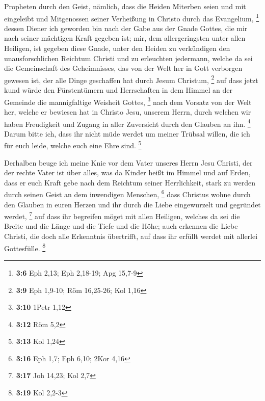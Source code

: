 Propheten durch den Geist,  nämlich, dass die Heiden
Miterben seien und mit eingeleibt und Mitgenossen seiner Verheißung in
Christo durch das Evangelium, \footnote{\textbf{3:6} Eph 2,13; Eph
  2,18-19; Apg 15,7-9}  dessen Diener ich geworden bin nach
der Gabe aus der Gnade Gottes, die mir nach seiner mächtigen Kraft
gegeben ist;  mir, dem allergeringsten unter allen Heiligen,
ist gegeben diese Gnade, unter den Heiden zu verkündigen den
unausforschlichen Reichtum Christi  und zu erleuchten
jedermann, welche da sei die Gemeinschaft des Geheimnisses, das von der
Welt her in Gott verborgen gewesen ist, der alle Dinge geschaffen hat
durch Jesum Christum, \footnote{\textbf{3:9} Eph 1,9-10; Röm 16,25-26;
  Kol 1,16}  auf dass jetzt kund würde den Fürstentümern
und Herrschaften in dem Himmel an der Gemeinde die mannigfaltige
Weisheit Gottes, \footnote{\textbf{3:10} 1Petr 1,12}  nach
dem Vorsatz von der Welt her, welche er bewiesen hat in Christo Jesu,
unserem Herrn,  durch welchen wir haben Freudigkeit und
Zugang in aller Zuversicht durch den Glauben an ihn. \footnote{\textbf{3:12}
  Röm 5,2}  Darum bitte ich, dass ihr nicht müde werdet um
meiner Trübsal willen, die ich für euch leide, welche euch eine Ehre
sind. \footnote{\textbf{3:13} Kol 1,24}

 Derhalben beuge ich meine Knie vor dem Vater unseres Herrn
Jesu Christi,  der der rechte Vater ist über alles, was da
Kinder heißt im Himmel und auf Erden,  dass er euch Kraft
gebe nach dem Reichtum seiner Herrlichkeit, stark zu werden durch seinen
Geist an dem inwendigen Menschen, \footnote{\textbf{3:16} Eph 1,7; Eph
  6,10; 2Kor 4,16}  dass Christus wohne durch den Glauben
in euren Herzen und ihr durch die Liebe eingewurzelt und gegründet
werdet, \footnote{\textbf{3:17} Joh 14,23; Kol 2,7}  auf
dass ihr begreifen möget mit allen Heiligen, welches da sei die Breite
und die Länge und die Tiefe und die Höhe;  auch erkennen
die Liebe Christi, die doch alle Erkenntnis übertrifft, auf dass ihr
erfüllt werdet mit allerlei Gottesfülle. \footnote{\textbf{3:19} Kol
  2,2-3}


